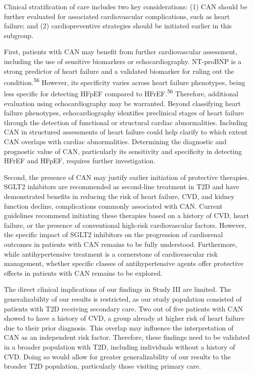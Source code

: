 \documentclass[
  letterpaper,
  headsepline=true,
  open=any]{scrbook}
\begin{document}
Clinical stratification of care includes two key considerations: (1) CAN
should be further evaluated for associated cardiovascular complications,
such as heart failure; and (2) cardiopreventive strategies should be
initiated earlier in this subgroup.

First, patients with CAN may benefit from further cardiovascular
assessment, including the use of sensitive biomarkers or
echocardiography. NT-proBNP is a strong predictor of heart failure and a
validated biomarker for ruling out the condition.\textsuperscript{56}
However, its specificity varies across heart failure phenotypes, being
less specific for detecting HFpEF compared to HFrEF.\textsuperscript{56}
Therefore, additional evaluation using echocardiography may be
warranted. Beyond classifying heart failure phenotypes, echocardiography
identifies preclinical stages of heart failure through the detection of
functional or structural cardiac abnormalities. Including CAN in
structured assessments of heart failure could help clarify to which
extent CAN overlaps with cardiac abnormalities. Determining the
diagnostic and prognostic value of CAN, particularly its sensitivity and
specificity in detecting HFrEF and HFpEF, requires further
investigation.

Second, the presence of CAN may justify earlier initiation of protective
therapies. SGLT2 inhibitors are recommended as second-line treatment in
T2D and have demonstrated benefits in reducing the risk of heart
failure, CVD, and kidney function decline, complications commonly
associated with CAN. Current guidelines recommend initiating these
therapies based on a history of CVD, heart failure, or the presence of
conventional high-risk cardiovascular factors. However, the specific
impact of SGLT2 inhibitors on the progression of cardiorenal outcomes in
patients with CAN remains to be fully understood. Furthermore, while
antihypertensive treatment is a cornerstone of cardiovascular risk
management, whether specific classes of antihypertensive agents offer
protective effects in patients with CAN remains to be explored.

The direct clinical implications of our findings in Study III are
limited. The generalizability of our results is restricted, as our study
population consisted of patients with T2D receiving secondary care. Two
out of five patients with CAN showed to have a history of CVD, a group
already at higher risk of heart failure due to their prior diagnosis.
This overlap may influence the interpretation of CAN as an independent
risk factor. Therefore, these findings need to be validated in a broader
population with T2D, including individuals without a history of CVD.
Doing so would allow for greater generalizability of our results to the
broader T2D population, particularly those visiting primary care.
\end{document}
